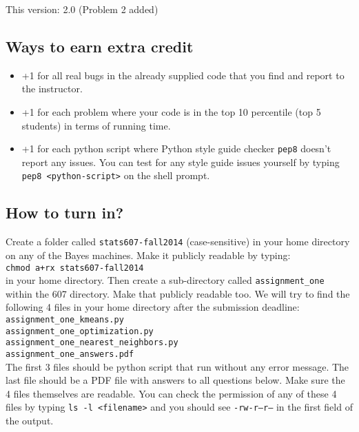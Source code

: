 \documentclass{article}
\begin{document}
\maketitle

\begin{center}
This version: 2.0 (Problem 2 added)
\end{center}

\subsection*{Ways to earn extra credit}

\begin{itemize}
\item +1 for all real bugs in the already supplied code that you find and report to the instructor.
\item +1 for each problem where your code is in the top 10 percentile (top 5 students) in terms of running time.
\item +1 for each python script where Python style guide checker {\tt pep8} doesn't report any issues. You can test for any style guide issues yourself by typing
{\tt pep8 <python-script>} on the shell prompt.

\end{itemize}

\subsection*{How to turn in?}

Create a folder called {\tt stats607-fall2014} (case-sensitive) in your home directory on any of the Bayes machines. Make it publicly readable by typing:\\
{\tt chmod a+rx stats607-fall2014} \\
in your home directory. Then create a sub-directory called {\tt assignment\_one} within the 607 directory. Make that publicly readable too. We will try to find the
following 4 files in your home directory after the submission deadline:\\
{\tt assignment\_one\_kmeans.py} \\
{\tt assignment\_one\_optimization.py} \\
{\tt assignment\_one\_nearest\_neighbors.py} \\
{\tt assignment\_one\_answers.pdf} \\

The first 3 files should be python script that run without any error message. The last file should be a PDF file with answers to all questions below. Make sure the 4 files
themselves are readable. You can check the permission of any of these 4 files by typing {\tt ls -l <filename>} and you should see {\tt -rw-r--r--} in the first field of the output.
\end{document}

